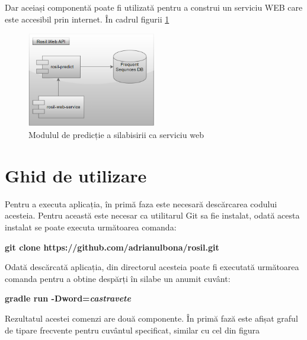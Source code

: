Dar aceiași componentă poate fi utilizată pentru a construi un serviciu WEB care este accesibil prin internet. În cadrul figurii \ref{fig:rosil-service}

\begin{figure}[h!]
    \centering
    \includegraphics[width=0.50\textwidth]{figures/rosil-service.png}
    \caption{Modulul de predicție a silabisirii ca serviciu web}
    \label{fig:rosil-service}
\end{figure}

\section{Ghid de utilizare}

Pentru a executa aplicația, în primă faza este necesară descărcarea codului acesteia. Pentru această este necesar ca utilitarul Git sa fie instalat, odată acesta instalat se poate executa următoarea comanda:

\begin{center}
\textbf{git clone https://github.com/adrianulbona/rosil.git}
\end{center} 

Odată descărcată aplicația, din directorul acesteia poate fi executată următoarea comanda pentru a obtine despărți în silabe un anumit cuvânt:

\begin{center}
\textbf{gradle run -Dword=\textit{castravete}}
\end{center} 

Rezultatul acestei comenzi are două componente. În primă fază este afișat graful de tipare frecvente pentru cuvântul specificat, similar cu cel din figura 

